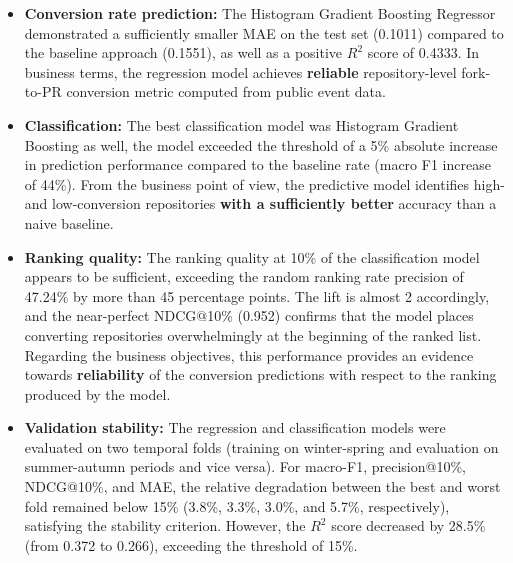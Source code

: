 \begin{itemize}
  \item \textbf{Conversion rate prediction:} The Histogram Gradient Boosting Regressor demonstrated a sufficiently smaller MAE on the test set (0.1011) compared to the baseline approach (0.1551), as well as a positive $R^2$ score of 0.4333. In business terms, the regression model achieves \textbf{reliable} repository-level fork-to-PR conversion metric computed from public event data.
  \item \textbf{Classification:} The best classification model was Histogram Gradient Boosting as well, the model exceeded the threshold of a 5\% absolute increase in prediction performance compared to the baseline rate (macro F1 increase of 44\%). From the business point of view, the predictive model identifies high- and low-conversion repositories \textbf{with a sufficiently better} accuracy than a naive baseline.
  \item \textbf{Ranking quality:} The ranking quality at 10\% of the classification model appears to be sufficient, exceeding the random ranking rate precision of 47.24\% by more than 45 percentage points. The lift is almost 2 accordingly, and the near‑perfect NDCG@10\% (0.952) confirms that the model places converting repositories overwhelmingly at the beginning of the ranked list. Regarding the business objectives, this performance provides an evidence towards \textbf{reliability} of the conversion predictions with respect to the ranking produced by the model.
  \item \textbf{Validation stability:} The regression and classification models were evaluated on two temporal folds (training on winter-spring and evaluation on summer-autumn periods and vice versa). For macro-F1, precision@10\%, NDCG@10\%, and MAE, the relative degradation between the best and worst fold remained below 15\% (3.8\%, 3.3\%, 3.0\%, and 5.7\%, respectively), satisfying the stability criterion. However, the \(R^2\) score decreased by 28.5\% (from 0.372 to 0.266), exceeding the threshold of 15\%.


\end{itemize}
